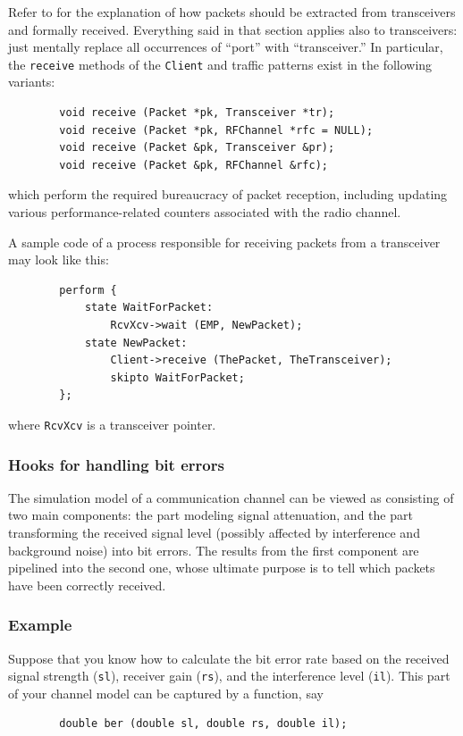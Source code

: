 Refer to  for the explanation of how packets should be
extracted from transceivers and formally received.
Everything said in that section applies also to transceivers: just mentally
replace all occurrences of ``port'' with ``transceiver.''
In particular, the {\tt receive} methods of the {\tt Client} and
traffic patterns exist in the following variants:
\begin{verbatim}
        void receive (Packet *pk, Transceiver *tr);
        void receive (Packet *pk, RFChannel *rfc = NULL);
        void receive (Packet &pk, Transceiver &pr);
        void receive (Packet &pk, RFChannel &rfc);
\end{verbatim}
\noindent
which perform the required bureaucracy of packet reception, including updating
various performance-related counters associated with the radio channel.

A sample code of a process responsible for receiving packets from a transceiver
may look like this:
\begin{verbatim}
        perform {
            state WaitForPacket:
                RcvXcv->wait (EMP, NewPacket);
            state NewPacket:
                Client->receive (ThePacket, TheTransceiver);
                skipto WaitForPacket;
        };
\end{verbatim}
\noindent
where {\tt RcvXcv} is a transceiver pointer.

\subsubsection{Hooks for handling bit errors}
\label{rm_tr_ac_be}

The simulation model of a communication channel can be viewed as consisting of
two main components: the part modeling signal attenuation, and the part
transforming the received signal level (possibly affected by interference
and background noise) into bit errors.
The results from the first component are pipelined into the
second one, whose ultimate purpose is to tell which packets have
been correctly received.

\subsubsection*{Example}

Suppose that you know how to calculate the bit
error rate based on the received signal strength ({\tt sl}),
receiver gain ({\tt rs}), and the interference level ({\tt il}).
This part of your channel model can be captured by a function, say
\begin{verbatim}
        double ber (double sl, double rs, double il);
\end{verbatim}

